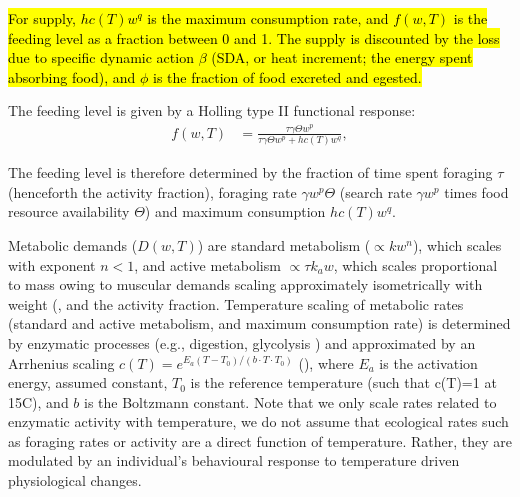 \documentclass[11pt]{article}\usepackage[]{graphicx}\usepackage[]{color,soul}
\begin{document}
\hl{ For supply, $h c(T) w^q$ is the maximum consumption rate, and $f(w,T)$ is the feeding level as a fraction between 0 and 1. The supply is discounted by the loss due to specific dynamic action  $\beta$ (SDA, or heat increment; the energy spent absorbing food), and $\phi$ is the fraction of food excreted and egested.} 

The feeding level is given by a Holling type II functional response:
\begin{align}
  f(w,T) &= \frac{\tau \gamma\Theta w^{p} }{\tau \gamma\Theta w^{p} + h c(T) w^q}, \label{eq:f} 
\end{align}

The feeding level is therefore determined by the fraction of time spent foraging $\tau$ (henceforth the activity fraction), foraging rate $\gamma w^p \Theta$ (search rate $\gamma w^p$ times food resource availability $\Theta$) and maximum consumption $h c(T) w^q$.


Metabolic demands ($D(w,T)$) are standard metabolism ($\propto k w^n$), which scales with exponent $n<1$, and active metabolism $\propto \tau k_a w$, which scales proportional to mass owing to muscular demands scaling approximately isometrically with weight (\citealt{glazier_activity_2009,brett_1965_relation}, and the activity fraction. Temperature scaling of metabolic rates (standard and active metabolism, and maximum consumption rate) is determined by enzymatic processes (e.g., digestion, glycolysis \citealt{jeschke_predator_2002, sentis_parsing_2013}) and approximated by an Arrhenius scaling $c(T) = e^{E_a(T-T_0)/(b\cdot T\cdot T_0)}$ (\citealt{gilloolyeffects2001}), where $E_a$ is the activation energy, assumed constant, $T_0$ is the reference temperature (such that c(T)=1 at 15\degree C), and $b$ is the Boltzmann constant. Note that we only scale rates related to enzymatic activity with temperature, we do not assume that ecological rates such as foraging rates or activity are a direct function of temperature. Rather, they are modulated by an individual's behavioural response to temperature driven physiological changes.
\end{document}
